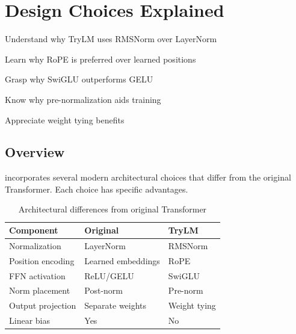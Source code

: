 \chapter{Design Choices Explained}
\label{ch:design-choices}

\begin{objectives}
    \item Understand why TryLM uses RMSNorm over LayerNorm
    \item Learn why RoPE is preferred over learned positions
    \item Grasp why SwiGLU outperforms GELU
    \item Know why pre-normalization aids training
    \item Appreciate weight tying benefits
\end{objectives}

\section{Overview}

\TryLM incorporates several modern architectural choices that differ from the original Transformer. Each choice has specific advantages.

\begin{table}[H]
\centering
\begin{tabular}{lll}
\toprule
\textbf{Component} & \textbf{Original} & \textbf{TryLM} \\
\midrule
Normalization & LayerNorm & RMSNorm \\
Position encoding & Learned embeddings & RoPE \\
FFN activation & ReLU/GELU & SwiGLU \\
Norm placement & Post-norm & Pre-norm \\
Output projection & Separate weights & Weight tying \\
Linear bias & Yes & No \\
\bottomrule
\end{tabular}
\caption{Architectural differences from original Transformer}
\end{table}

